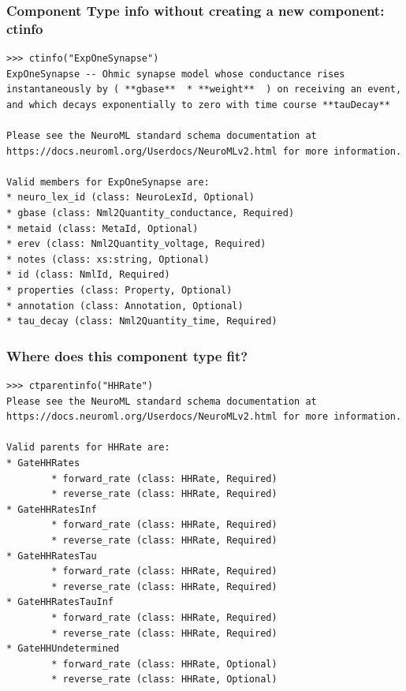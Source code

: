 \begin{frame}[t,fragile]
  \frametitle{Component Type info without creating a new component: ctinfo}
  \begin{verbatim}
>>> ctinfo("ExpOneSynapse")
ExpOneSynapse -- Ohmic synapse model whose conductance rises instantaneously by ( **gbase**  * **weight**  ) on receiving an event, and which decays exponentially to zero with time course **tauDecay**

Please see the NeuroML standard schema documentation at https://docs.neuroml.org/Userdocs/NeuroMLv2.html for more information.

Valid members for ExpOneSynapse are:
* neuro_lex_id (class: NeuroLexId, Optional)
* gbase (class: Nml2Quantity_conductance, Required)
* metaid (class: MetaId, Optional)
* erev (class: Nml2Quantity_voltage, Required)
* notes (class: xs:string, Optional)
* id (class: NmlId, Required)
* properties (class: Property, Optional)
* annotation (class: Annotation, Optional)
* tau_decay (class: Nml2Quantity_time, Required)

  \end{verbatim}
\end{frame}
\begin{frame}[t,fragile]
  \frametitle{Where does this component type fit?}
  \begin{verbatim}
>>> ctparentinfo("HHRate")
Please see the NeuroML standard schema documentation at https://docs.neuroml.org/Userdocs/NeuroMLv2.html for more information.

Valid parents for HHRate are:
* GateHHRates
        * forward_rate (class: HHRate, Required)
        * reverse_rate (class: HHRate, Required)
* GateHHRatesInf
        * forward_rate (class: HHRate, Required)
        * reverse_rate (class: HHRate, Required)
* GateHHRatesTau
        * forward_rate (class: HHRate, Required)
        * reverse_rate (class: HHRate, Required)
* GateHHRatesTauInf
        * forward_rate (class: HHRate, Required)
        * reverse_rate (class: HHRate, Required)
* GateHHUndetermined
        * forward_rate (class: HHRate, Optional)
        * reverse_rate (class: HHRate, Optional)
  \end{verbatim}
\end{frame}
